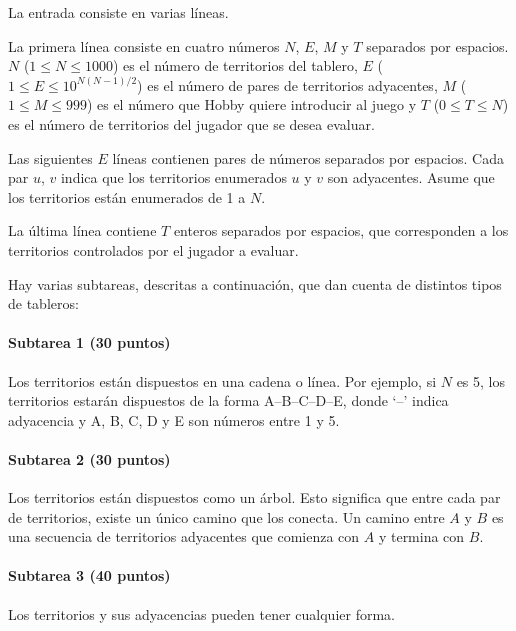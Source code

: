 \documentclass{oci}
\begin{document}
\begin{inputDescription}
  La entrada consiste en varias líneas.

  La primera línea consiste en cuatro números $N$, $E$, $M$ y $T$ separados por
  espacios.
  $N$ ($1 \le N \le 1000$) es el número de territorios del tablero,
  $E$ ($1 \le E \le 10^{N(N-1)/2}$) es el número de pares de territorios
  adyacentes,
  $M$ ($1 \le M \le 999$) es el número que Hobby quiere introducir al juego y
  $T$ ($0 \le T \le N$) es el número de territorios del jugador que se desea
  evaluar.

  Las siguientes $E$ líneas contienen pares de números separados por espacios.
  Cada par $u$, $v$ indica que los territorios enumerados $u$ y $v$ son
  adyacentes.
  Asume que los territorios están enumerados de 1 a $N$.

  La última línea contiene $T$ enteros separados por espacios, que corresponden
  a los territorios controlados por el jugador a evaluar.

  Hay varias subtareas, descritas a continuación, que dan cuenta de distintos
  tipos de tableros:

  \paragraph{Subtarea 1 (30 puntos)} Los territorios están dispuestos en una
  cadena o línea.
  Por ejemplo, si $N$ es 5, los territorios estarán dispuestos de la forma
  A--B--C--D--E, donde `--' indica adyacencia y A, B, C, D y E son números
  entre 1 y 5.

  \paragraph{Subtarea 2 (30 puntos)} Los territorios están dispuestos como un
  árbol.
  Esto significa que entre cada par de territorios, existe un único camino que
  los conecta.
  Un camino entre $A$ y $B$ es una secuencia de territorios adyacentes que
  comienza con $A$ y termina con $B$.

  \paragraph{Subtarea 3 (40 puntos)} Los territorios y sus adyacencias pueden
  tener cualquier forma.
  

\end{inputDescription}
\end{document}
